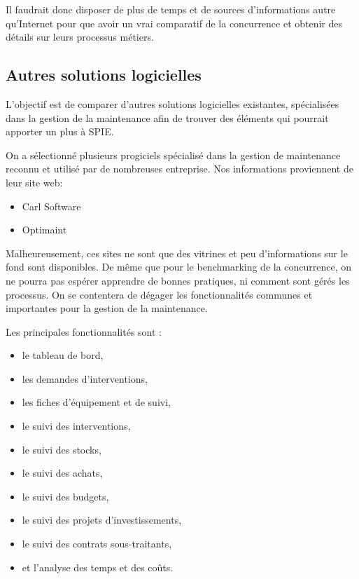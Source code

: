 Il faudrait donc disposer de plus de temps et de sources d'informations autre qu'Internet pour que avoir un vrai comparatif de la concurrence et obtenir des détails sur leurs processus métiers.

\subsection{Autres solutions logicielles}

L’objectif est de comparer d’autres solutions logicielles existantes, spécialisées dans la gestion de la maintenance afin de trouver des éléments qui pourrait apporter un plus à SPIE.

On a sélectionné plusieurs progiciels spécialisé dans la gestion de maintenance reconnu et utilisé par de nombreuses entreprise. Nos informations proviennent de leur site web:

\begin{itemize}
\item Carl Software\footnotemark


\item Optimaint\footnotemark


\end{itemize}

Malheureusement, ces sites ne sont que des vitrines et peu d’informations sur le fond sont disponibles. De même que pour le benchmarking de la concurrence, on ne pourra pas espérer apprendre de bonnes pratiques, ni comment sont gérés les processus. On se contentera de dégager les fonctionnalités communes et importantes pour la gestion de la maintenance.

Les principales fonctionnalités sont :

\begin{itemize}
\item le tableau de bord,
\item les demandes d’interventions,
\item les fiches d'équipement et de suivi,
\item le suivi des interventions,
\item le suivi des stocks,
\item le suivi des achats,
\item le suivi des budgets,
\item le suivi des projets d’investissements,
\item le suivi des contrats sous-traitants,
\item et l'analyse des temps et des coûts.
\end{itemize}

